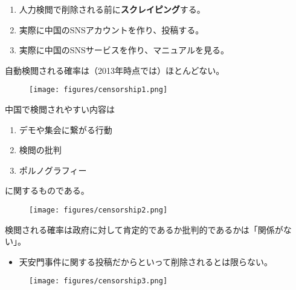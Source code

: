\documentclass[
  xelatex,
  ja=standard]{bxjsarticle}
\providecommand{\tightlist}{%
  \setlength{\itemsep}{0pt}\setlength{\parskip}{0pt}}\usepackage{longtable,booktabs,array}
\begin{document}
\begin{enumerate}
\def\labelenumi{\arabic{enumi}.}
\tightlist
\item
  人力検閲で削除される前に\textbf{スクレイピング}する。
\item
  実際に中国のSNSアカウントを作り、投稿する。
\item
  実際に中国のSNSサービスを作り、マニュアルを見る。
\end{enumerate}

自動検閲される確率は（2013年時点では）ほとんどない。

\begin{figure}[htpb]

{\centering \texttt{[image: figures/censorship1.png]}

}

\caption{\citet{king2014}}

\end{figure}

中国で検閲されやすい内容は

\begin{enumerate}
\def\labelenumi{\arabic{enumi}.}
\tightlist
\item
  デモや集会に繋がる行動
\item
  検閲の批判
\item
  ポルノグラフィー
\end{enumerate}

に関するものである。

\begin{figure}[htpb]

{\centering \texttt{[image: figures/censorship2.png]}

}

\caption{\citet{king2013}}

\end{figure}

検閲される確率は政府に対して肯定的であるか批判的であるかは「関係がない」。

\begin{itemize}
\tightlist
\item
  天安門事件に関する投稿だからといって削除されるとは限らない。
\end{itemize}

\begin{figure}[htpb]

{\centering \texttt{[image: figures/censorship3.png]}

}

\caption{\citet{king2013}}

\end{figure}
\end{document}
